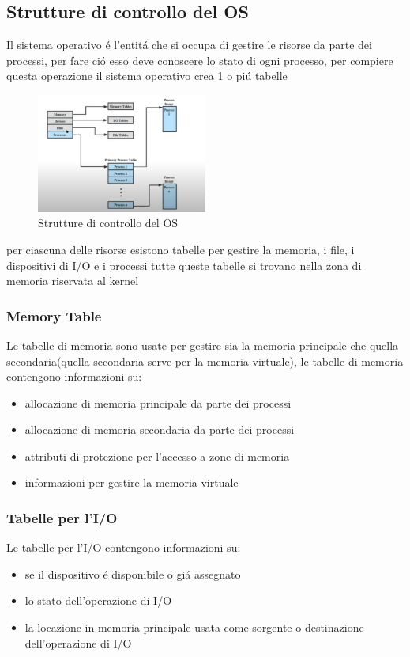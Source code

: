 \subsection{Strutture di controllo del OS}
Il sistema operativo é l'entitá che si occupa di gestire le risorse da parte dei processi,
per fare ció esso deve conoscere lo stato di ogni processo, per compiere questa operazione il sistema operativo
crea 1 o piú tabelle
\begin{figure}
    \centering
    \includegraphics[width=0.5\textwidth]{immagini/ControlTable}
    \caption{Strutture di controllo del OS}
\end{figure}
per ciascuna delle risorse esistono tabelle per gestire la memoria, i file, i dispositivi di I/O e i processi
tutte queste tabelle si trovano nella zona di memoria riservata al kernel
\subsubsection{Memory Table}
Le tabelle di memoria sono usate per gestire sia la memoria principale che quella secondaria(quella secondaria serve per la memoria virtuale),
le tabelle di memoria contengono informazioni su:
\begin{itemize}
    \item allocazione di memoria principale da parte dei processi
    \item allocazione di memoria secondaria da parte dei processi
    \item attributi di protezione per l'accesso a zone di memoria
    \item informazioni per gestire la memoria virtuale
\end{itemize}
\subsubsection{Tabelle per l'I/O}
Le tabelle per l'I/O contengono informazioni su:
\begin{itemize}
    \item se il dispositivo é disponibile o giá assegnato
    \item lo stato dell'operazione di I/O
    \item la locazione in memoria principale usata come sorgente o destinazione dell'operazione di I/O
\end{itemize}
